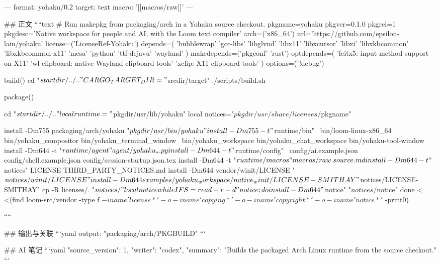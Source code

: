 ---
format: yohaku/0.2
target: text
macro: '[[macros/raw]]'
---

## 正文
````text
# Run makepkg from packaging/arch in a Yohaku source checkout.
pkgname=yohaku
pkgver=0.1.0
pkgrel=1
pkgdesc='Native workspace for people and AI, with the Loom text compiler'
arch=('x86_64')
url='https://github.com/epsilon-lain/yohaku'
license=('LicenseRef-Yohaku')
depends=(
    'bubblewrap' 'gcc-libs' 'libglvnd' 'libx11' 'libxcursor' 'libxi'
    'libxkbcommon' 'libxkbcommon-x11' 'mesa' 'python' 'ttf-dejavu' 'wayland'
)
makedepends=('pkgconf' 'rust')
optdepends=(
    'fcitx5: input method support on X11'
    'wl-clipboard: native Wayland clipboard tools'
    'xclip: X11 clipboard tools'
)
options=('!debug')

build() {
    cd "$startdir/../.."
    CARGO_TARGET_DIR="$srcdir/target" ./scripts/build.sh
}

package() {
    cd "$startdir/../.."
    local runtime="$pkgdir/usr/lib/yohaku"
    local notices="$pkgdir/usr/share/licenses/$pkgname"

    install -Dm755 packaging/arch/yohaku "$pkgdir/usr/bin/yohaku"
    install -Dm755 -t "$runtime/bin" \
        bin/loom-linux-x86_64 bin/yohaku_compositor bin/yohaku_terminal_window \
        bin/yohaku_workspace bin/yohaku_chat_workspace bin/yohaku-tool-window
    install -Dm644 -t "$runtime/agent" agent/yohaku_*.py
    install -Dm644 -t "$runtime/config" \
        config/ai.example.json config/shell.example.json config/session-startup.json.tex
    install -Dm644 -t "$runtime/macros" macros/raw.source.md

    install -Dm644 -t "$notices" LICENSE THIRD_PARTY_NOTICES.md
    install -Dm644 vendor/winit/LICENSE "$notices/winit/LICENSE"
    install -Dm644 examples/yohaku_workspace/native_winit/LICENSE-SMITHAY "$notices/LICENSE-SMITHAY"
    cp -R licenses/. "$notices/"
    local notice
    while IFS= read -r -d '' notice; do
        install -Dm644 "$notice" "$notices/$notice"
    done < <(find loom-src/vendor -type f \( -iname 'license*' -o -iname 'copying*' -o -iname 'copyright*' -o -iname 'notice*' \) -print0)
}
````

## 输出与关联
```yaml
output: "packaging/arch/PKGBUILD"
```

## AI 笔记
```yaml
{"source_version": 1, "writer": "codex", "summary": "Builds the packaged Arch Linux runtime from the source checkout."}
```
